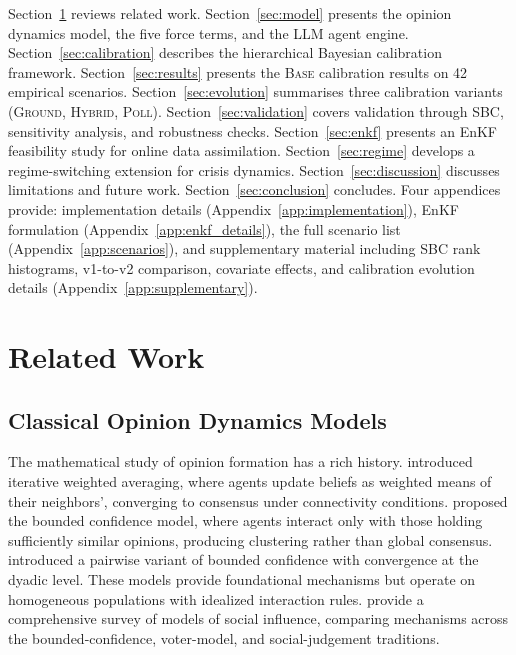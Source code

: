 \documentclass[12pt]{article}
\begin{document}
Section~\ref{sec:related} reviews related work. Section~\ref{sec:model} presents the opinion dynamics model, the five force terms, and the LLM agent engine. Section~\ref{sec:calibration} describes the hierarchical Bayesian calibration framework. Section~\ref{sec:results} presents the \textsc{Base} calibration results on 42 empirical scenarios. Section~\ref{sec:evolution} summarises three calibration variants (\textsc{Ground}, \textsc{Hybrid}, \textsc{Poll}). Section~\ref{sec:validation} covers validation through SBC, sensitivity analysis, and robustness checks. Section~\ref{sec:enkf} presents an EnKF feasibility study for online data assimilation. Section~\ref{sec:regime} develops a regime-switching extension for crisis dynamics. Section~\ref{sec:discussion} discusses limitations and future work. Section~\ref{sec:conclusion} concludes. Four appendices provide: implementation details (Appendix~\ref{app:implementation}), EnKF formulation (Appendix~\ref{app:enkf_details}), the full scenario list (Appendix~\ref{app:scenarios}), and supplementary material including SBC rank histograms, v1-to-v2 comparison, covariate effects, and calibration evolution details (Appendix~\ref{app:supplementary}).

\section{Related Work}
\label{sec:related}

\subsection{Classical Opinion Dynamics Models}

The mathematical study of opinion formation has a rich history. \citet{degroot1974} introduced iterative weighted averaging, where agents update beliefs as weighted means of their neighbors', converging to consensus under connectivity conditions. \citet{hegselmann2002} proposed the bounded confidence model, where agents interact only with those holding sufficiently similar opinions, producing clustering rather than global consensus. \citet{deffuant2000} introduced a pairwise variant of bounded confidence with convergence at the dyadic level. These models provide foundational mechanisms but operate on homogeneous populations with idealized interaction rules. \citet{flache2017} provide a comprehensive survey of models of social influence, comparing mechanisms across the bounded-confidence, voter-model, and social-judgement traditions.
\end{document}
